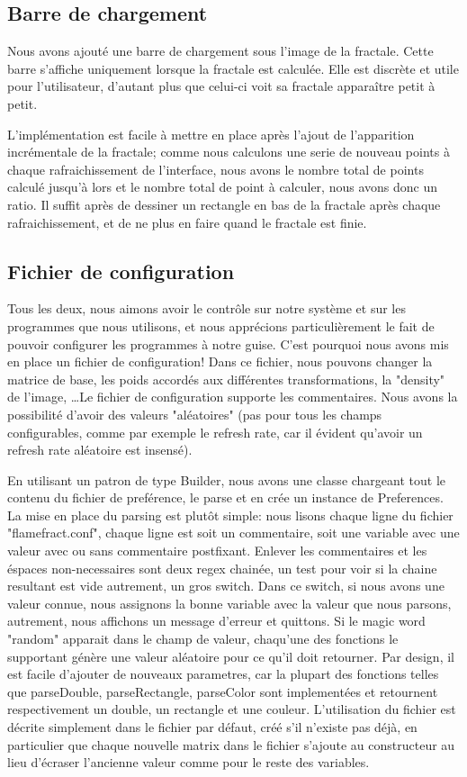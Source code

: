 \documentclass[a4paper]{article}
\begin{document}
\subsection*{Barre de chargement}
Nous avons ajouté une barre de chargement sous l'image de la fractale. Cette barre s'affiche uniquement lorsque la fractale est calculée. Elle est discrète et utile pour l'utilisateur, d'autant plus que celui-ci voit sa fractale apparaître petit à petit.

L'implémentation est facile à mettre en place après l'ajout de l'apparition incrémentale de la fractale; comme nous calculons une serie de nouveau points à chaque rafraichissement de l'interface, nous avons le nombre total de points calculé jusqu'à lors et le nombre total de point à calculer, nous avons donc un ratio. Il suffit après de dessiner un rectangle en bas de la fractale après chaque rafraichissement, et de ne plus en faire quand le fractale est finie.

\subsection*{Fichier de configuration}
Tous les deux, nous aimons avoir le contrôle sur notre système et sur les programmes que nous utilisons, et nous apprécions particulièrement le fait de pouvoir configurer les programmes à notre guise. C'est pourquoi nous avons mis en place un fichier de configuration! Dans ce fichier, nous pouvons changer la matrice de base, les poids accordés aux différentes transformations, la "density" de l'image, \ldots Le fichier de configuration supporte les commentaires. Nous avons la possibilité d'avoir des valeurs "aléatoires" (pas pour tous les champs configurables, comme par exemple le refresh rate, car il évident qu'avoir un refresh rate aléatoire est insensé).

En utilisant un patron de type Builder, nous avons une classe chargeant tout le contenu du fichier de preférence, le parse et en crée un instance de Preferences. La mise en place du parsing est plutôt simple: nous lisons chaque ligne du fichier "flamefract.conf", chaque ligne est soit un commentaire, soit une variable avec une valeur avec ou sans commentaire postfixant. Enlever les commentaires et les éspaces non-necessaires sont deux regex chainée, un test pour voir si la chaine resultant est vide autrement, un gros switch. Dans ce switch, si nous avons une valeur connue, nous assignons la bonne variable avec la valeur que nous parsons, autrement, nous affichons un message d'erreur et quittons. Si le magic word "random" apparait dans le champ de valeur, chaqu'une des fonctions le supportant génère une valeur aléatoire pour ce qu'il doit retourner. Par design, il est facile d'ajouter de nouveaux parametres, car la plupart des fonctions telles que parseDouble, parseRectangle, parseColor sont implementées et retournent respectivement un double, un rectangle et une couleur. L'utilisation du fichier est décrite simplement dans le fichier par défaut, créé s'il n'existe pas déjà, en particulier que chaque nouvelle matrix dans le fichier s'ajoute au constructeur au lieu d'écraser l'ancienne valeur comme pour le reste des variables.
\end{document}
